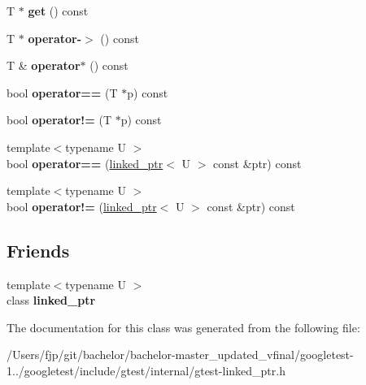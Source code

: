 \begin{DoxyCompactItemize}
T $\ast$ {\bfseries get} () const
\item 
\mbox{\label{classtesting_1_1internal_1_1linked__ptr_a23ff85ac97eed03e945034b65c8eb900}} 
T $\ast$ {\bfseries operator-\/$>$} () const
\item 
\mbox{\label{classtesting_1_1internal_1_1linked__ptr_ac94ad266bf41cbf979a95ca2870908d9}} 
T \& {\bfseries operator$\ast$} () const
\item 
\mbox{\label{classtesting_1_1internal_1_1linked__ptr_ad87ac8ff5543b6fad66e2f3c9844581a}} 
bool {\bfseries operator==} (T $\ast$p) const
\item 
\mbox{\label{classtesting_1_1internal_1_1linked__ptr_a10305395af92bd2fec7bca085cabc99c}} 
bool {\bfseries operator!=} (T $\ast$p) const
\item 
\mbox{\label{classtesting_1_1internal_1_1linked__ptr_a79306e959a4ae7b3a9da641d2ba06ce6}} 
{\footnotesize template$<$typename U $>$ }\\bool {\bfseries operator==} (\mbox{\hyperlink{classtesting_1_1internal_1_1linked__ptr}{linked\+\_\+ptr}}$<$ U $>$ const \&ptr) const
\item 
\mbox{\label{classtesting_1_1internal_1_1linked__ptr_a4801114a83a9e12b08f90e0d28318f26}} 
{\footnotesize template$<$typename U $>$ }\\bool {\bfseries operator!=} (\mbox{\hyperlink{classtesting_1_1internal_1_1linked__ptr}{linked\+\_\+ptr}}$<$ U $>$ const \&ptr) const
\end{DoxyCompactItemize}
\subsection*{Friends}
\begin{DoxyCompactItemize}
\item 
\mbox{\label{classtesting_1_1internal_1_1linked__ptr_a7763f286ca03a7f7363a033d996c8c1c}} 
{\footnotesize template$<$typename U $>$ }\\class {\bfseries linked\+\_\+ptr}
\end{DoxyCompactItemize}


The documentation for this class was generated from the following file\+:\begin{DoxyCompactItemize}
\item 
/\+Users/fjp/git/bachelor/bachelor-\/master\+\_\+updated\+\_\+vfinal/googletest-\/1../googletest/include/gtest/internal/gtest-\/linked\+\_\+ptr.\+h\end{DoxyCompactItemize}
